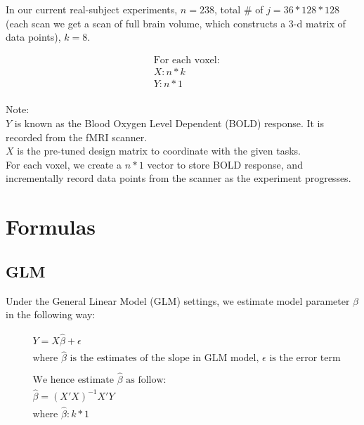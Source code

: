 \documentclass{article}
\begin{document}
In our current real-subject experiments, $n = 238$, total \# of $j = 36 * 128 * 128$ (each scan we get a scan of full brain volume, which constructs a 3-d matrix of data points), $k = 8$.

\begin{equation*}
    \label{Y}
    \begin{aligned}
    &\text{For each voxel:}\\
    &X: n * k\\
    &Y:n * 1
    \end{aligned}
\end{equation*}\\

\noindent Note:\\
$Y$ is known as the Blood Oxygen Level Dependent (BOLD) response. It is recorded from the fMRI scanner.\\
$X$ is the pre-tuned design matrix to coordinate with the given tasks.\\
For each voxel, we create a $n * 1$ vector to store BOLD response, and incrementally record data points from the scanner as the experiment progresses.

\section{Formulas}
\subsection{GLM}

Under the General Linear Model (GLM) settings, we estimate model parameter $\beta$ in the following way:

\begin{equation*}
    \label{beta_hat}
    \begin{aligned}
    &Y = X \hat{\beta} + \epsilon \\
    & \text{where $\hat\beta$ is the estimates of the slope in GLM model, $\epsilon$ is the error term} \\\\
    &\text{We hence estimate $\hat\beta$ as follow:}\\
    &\hat{\beta} = (X'X)^{-1}X'Y\\
    &\text{where $\hat{\beta}: k * 1$}\\
    \end{aligned}
\end{equation*}\\
\end{document}
